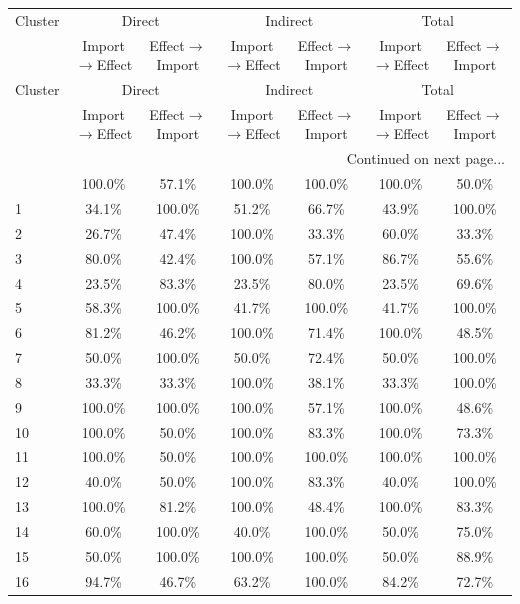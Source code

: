 \begin{longtable}{lcc|cc|cc}
\toprule
Cluster & \multicolumn{2}{c}{Direct} & \multicolumn{2}{c}{Indirect} & \multicolumn{2}{c}{Total} \\
 & Import$\rightarrow$Effect & Effect$\rightarrow$Import & Import$\rightarrow$Effect & Effect$\rightarrow$Import & Import$\rightarrow$Effect & Effect$\rightarrow$Import \\
\midrule
\endfirsthead
\toprule
Cluster & \multicolumn{2}{c}{Direct} & \multicolumn{2}{c}{Indirect} & \multicolumn{2}{c}{Total} \\
 & Import$\rightarrow$Effect & Effect$\rightarrow$Import & Import$\rightarrow$Effect & Effect$\rightarrow$Import & Import$\rightarrow$Effect & Effect$\rightarrow$Import \\
\midrule
\endhead
\midrule
\multicolumn{7}{r}{Continued on next page...} \\
\endfoot
\bottomrule
\endlastfoot
0 & 100.0\% & 57.1\% & 100.0\% & 100.0\% & 100.0\% & 50.0\% \\
1 & 34.1\% & 100.0\% & 51.2\% & 66.7\% & 43.9\% & 100.0\% \\
2 & 26.7\% & 47.4\% & 100.0\% & 33.3\% & 60.0\% & 33.3\% \\
3 & 80.0\% & 42.4\% & 100.0\% & 57.1\% & 86.7\% & 55.6\% \\
4 & 23.5\% & 83.3\% & 23.5\% & 80.0\% & 23.5\% & 69.6\% \\
5 & 58.3\% & 100.0\% & 41.7\% & 100.0\% & 41.7\% & 100.0\% \\
6 & 81.2\% & 46.2\% & 100.0\% & 71.4\% & 100.0\% & 48.5\% \\
7 & 50.0\% & 100.0\% & 50.0\% & 72.4\% & 50.0\% & 100.0\% \\
8 & 33.3\% & 33.3\% & 100.0\% & 38.1\% & 33.3\% & 100.0\% \\
9 & 100.0\% & 100.0\% & 100.0\% & 57.1\% & 100.0\% & 48.6\% \\
10 & 100.0\% & 50.0\% & 100.0\% & 83.3\% & 100.0\% & 73.3\% \\
11 & 100.0\% & 50.0\% & 100.0\% & 100.0\% & 100.0\% & 100.0\% \\
12 & 40.0\% & 50.0\% & 100.0\% & 83.3\% & 40.0\% & 100.0\% \\
13 & 100.0\% & 81.2\% & 100.0\% & 48.4\% & 100.0\% & 83.3\% \\
14 & 60.0\% & 100.0\% & 40.0\% & 100.0\% & 50.0\% & 75.0\% \\
15 & 50.0\% & 100.0\% & 100.0\% & 100.0\% & 50.0\% & 88.9\% \\
16 & 94.7\% & 46.7\% & 63.2\% & 100.0\% & 84.2\% & 72.7\% \\

\end{longtable}
